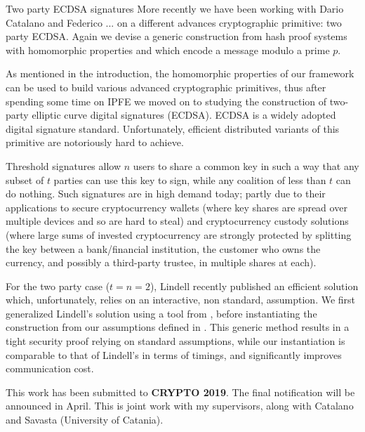 \documentclass[10pt]{beamer}
\begin{document}
\begin{frame}{Two party ECDSA signatures}
More recently we have been working with Dario Catalano and Federico ... on a different advances cryptographic primitive: two party ECDSA. Again we devise a generic construction from hash proof systems with homomorphic properties and which encode a message modulo a prime $p$.

As mentioned in the introduction, the homomorphic properties of our framework can be used to build various advanced cryptographic primitives, thus after spending some time on IPFE we moved on to studying the construction of two-party elliptic curve digital signatures (ECDSA).
%
ECDSA is a widely adopted digital signature standard. Unfortunately, efficient distributed variants of this primitive are notoriously hard to achieve. 

Threshold signatures allow $n$ users to share a common key in such a way that any subset of $t$ parties can use this key to sign, while any coalition of less than $t$ can do nothing. 
%
Such signatures are in high demand today; partly due to their applications to secure cryptocurrency wallets (where key shares are spread over multiple devices and so are hard to steal) and cryptocurrency custody solutions (where large sums of invested cryptocurrency are strongly protected by splitting the key between a bank/financial institution, the customer who owns the currency, and possibly a third-party trustee, in multiple shares at each).

For the two party case ($t=n=2$), Lindell \cite{C:Lindell17} recently published an efficient solution which, unfortunately, relies on an interactive, non standard, assumption. We first generalized Lindell’s solution using a tool from \cite{EC:CraSho02}, before instantiating the construction from our assumptions defined in \cite{AC:CasLagTuc18}. This generic method results in a tight security proof relying on standard assumptions, while
%
our instantiation is comparable to that of Lindell's in terms of timings, and significantly improves communication cost.

This work has been submitted to \textbf{CRYPTO 2019}. The final notification will be announced in April. This is joint work with my supervisors, along with Catalano and Savasta (University of Catania).


\end{frame}
\end{document}
